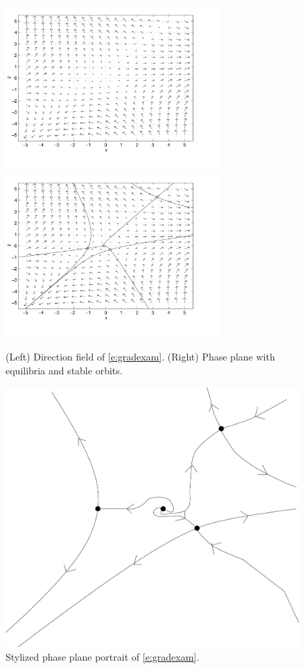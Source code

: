 \documentclass{ximera}
\begin{document}
\begin{figure}[htb]
           \centerline{%
	   \includegraphics[width=3.2in]{../figures/saddlea.pdf}
           \includegraphics[width=3.2in]{../figures/saddleb.pdf}}
           \caption{(Left) Direction field of \protect\eqref{e:gradexam}.
	(Right) Phase plane with equilibria and stable orbits.}
           \label{F:gradexam}
\end{figure}

\begin{figure}[htb]
           \centerline{%
           \includegraphics[width=3.in]{../figures/grad.pdf}}
           \caption{Stylized phase plane portrait of \protect\eqref{e:gradexam}.}
           \label{F:gradexamstyle}
\end{figure}



\end{document}
